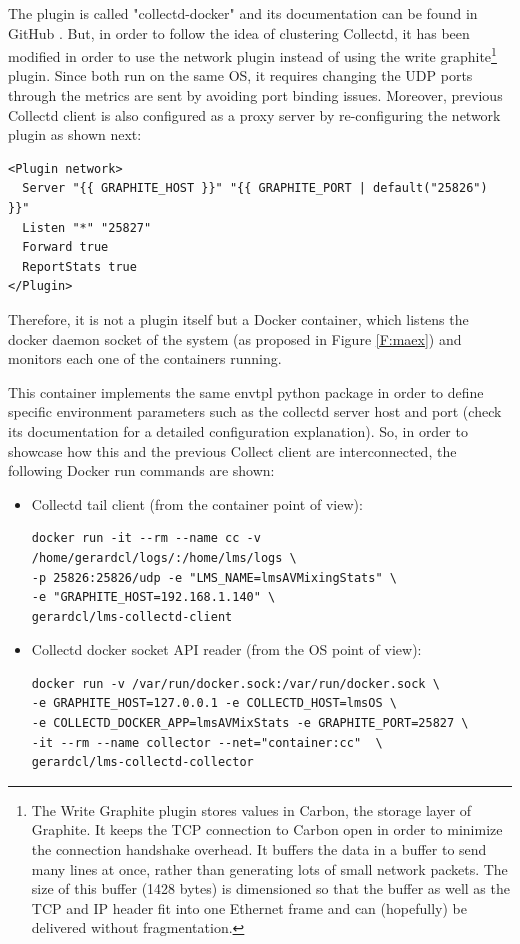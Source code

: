 The plugin is called "collectd-docker" and its documentation can be found in GitHub \cite{cdcontainer}. But, in order to follow the idea of clustering Collectd, it has been modified in order to use the network plugin instead of using the write graphite\footnote{The Write Graphite plugin stores values in Carbon, the storage layer of Graphite. It keeps the TCP connection to Carbon open in order to minimize the connection handshake overhead. It buffers the data in a buffer to send many lines at once, rather than generating lots of small network packets. The size of this buffer (1428 bytes) is dimensioned so that the buffer as well as the TCP and IP header fit into one Ethernet frame and can (hopefully) be delivered without fragmentation.} plugin. Since both run on the same OS, it requires changing the UDP ports through the metrics are sent by avoiding port binding issues. Moreover, previous Collectd client is also configured as a proxy server by re-configuring the network plugin as shown next: 

\begin{verbatim}
<Plugin network>
  Server "{{ GRAPHITE_HOST }}" "{{ GRAPHITE_PORT | default("25826") }}"
  Listen "*" "25827"
  Forward true
  ReportStats true
</Plugin>
\end{verbatim}

Therefore, it is not a plugin itself but a Docker container, which listens the docker daemon socket of the system (as proposed in Figure \ref{F:maex}) and monitors each one of the containers running.

This container implements the same envtpl python package in order to define specific environment parameters such as the collectd server host and port (check its documentation for a detailed configuration explanation). So, in order to showcase how this and the previous Collect client are interconnected, the following Docker run commands are shown:

\begin{itemize}
\item Collectd tail client (from the container point of view):
\begin{verbatim}
docker run -it --rm --name cc -v /home/gerardcl/logs/:/home/lms/logs \
-p 25826:25826/udp -e "LMS_NAME=lmsAVMixingStats" \
-e "GRAPHITE_HOST=192.168.1.140" \
gerardcl/lms-collectd-client
\end{verbatim}
\item Collectd docker socket API reader (from the OS point of view):
\begin{verbatim}
docker run -v /var/run/docker.sock:/var/run/docker.sock \
-e GRAPHITE_HOST=127.0.0.1 -e COLLECTD_HOST=lmsOS \
-e COLLECTD_DOCKER_APP=lmsAVMixStats -e GRAPHITE_PORT=25827 \
-it --rm --name collector --net="container:cc"  \
gerardcl/lms-collectd-collector
\end{verbatim}
\end{itemize}

